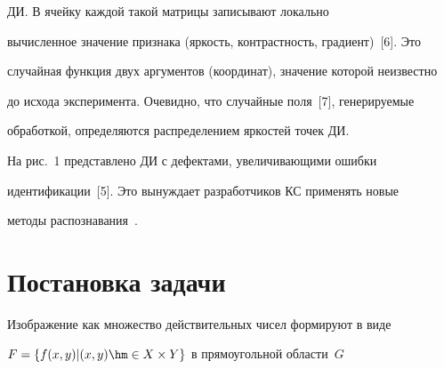 




\noindent


 ДИ. В ячейку каждой такой мат\-рицы записывают локально 


вычис\-ленное значение признака (яркость, контраст\-ность, градиент)~[6]. Это 


случайная функция двух аргументов (координат), значение которой неизвестно 


до исхода эксперимента. Очевидно, что случайные поля~[7], генерируемые 


обработкой, определяются распределением яркостей точек ДИ.


  


  На рис.~1 представлено ДИ с дефектами, увеличивающими ошибки 


идентификации~[5]. Это вынуждает разработчиков КС применять новые 


методы распознавания~\cite{2-gk, 3-gk}.





\section{Постановка задачи}





  Изображение как множество действительных чисел формируют в виде 


$F=\{f(x,y)\vert (x,y)\hm\in X\times Y\}$ в прямоугольной области~$G$ 


